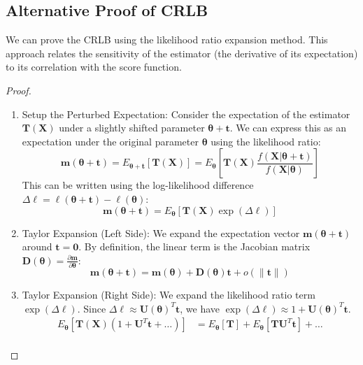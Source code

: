 \documentclass[
  letterpaper,
  DIV=11,
  numbers=noendperiod]{scrreprt}
\renewcommand{\[}{\begin{equation}}
\renewcommand{\]}{\end{equation}}
\theoremstyle{definition}
\theoremstyle{plain}
\theoremstyle{plain}
\theoremstyle{plain}
\theoremstyle{definition}
\theoremstyle{plain}
\theoremstyle{remark}
\begin{document}
\subsection{Alternative Proof of CRLB}\label{alternative-proof-of-crlb}

We can prove the CRLB using the likelihood ratio expansion method. This
approach relates the sensitivity of the estimator (the derivative of its
expectation) to its correlation with the score function.

\begin{proof}
\leavevmode

\begin{enumerate}
\def\labelenumi{\arabic{enumi}.}
\item
  Setup the Perturbed Expectation: Consider the expectation of the
  estimator \(\mathbf{T}(\mathbf{X})\) under a slightly shifted
  parameter \(\boldsymbol{\theta} + \mathbf{t}\). We can express this as
  an expectation under the original parameter \(\boldsymbol{\theta}\)
  using the likelihood ratio: \[
  \mathbf{m}(\boldsymbol{\theta} + \mathbf{t}) = E_{\boldsymbol{\theta} + \mathbf{t}}[\mathbf{T}(\mathbf{X})] = E_{\boldsymbol{\theta}} \left[ \mathbf{T}(\mathbf{X}) \frac{f(\mathbf{X}|\boldsymbol{\theta} + \mathbf{t})}{f(\mathbf{X}|\boldsymbol{\theta})} \right]
  \] This can be written using the log-likelihood difference
  \(\Delta \ell = \ell(\boldsymbol{\theta} + \mathbf{t}) - \ell(\boldsymbol{\theta})\):
  \[
  \mathbf{m}(\boldsymbol{\theta} + \mathbf{t}) = E_{\boldsymbol{\theta}} \left[ \mathbf{T}(\mathbf{X}) \exp(\Delta \ell) \right]
  \]
\item
  Taylor Expansion (Left Side): We expand the expectation vector
  \(\mathbf{m}(\boldsymbol{\theta} + \mathbf{t})\) around
  \(\mathbf{t}=\mathbf{0}\). By definition, the linear term is the
  Jacobian matrix
  \(\mathbf{D}(\boldsymbol{\theta}) = \frac{\partial \mathbf{m}}{\partial \boldsymbol{\theta}}\):
  \[
  \mathbf{m}(\boldsymbol{\theta} + \mathbf{t}) = \mathbf{m}(\boldsymbol{\theta}) + \mathbf{D}(\boldsymbol{\theta}) \mathbf{t} + o(\|\mathbf{t}\|)
  \]
\item
  Taylor Expansion (Right Side): We expand the likelihood ratio term
  \(\exp(\Delta \ell)\). Since
  \(\Delta \ell \approx \mathbf{U}(\boldsymbol{\theta})^T \mathbf{t}\),
  we have
  \(\exp(\Delta \ell) \approx 1 + \mathbf{U}(\boldsymbol{\theta})^T \mathbf{t}\).
  \[
  \begin{aligned}
  E_{\boldsymbol{\theta}} \left[ \mathbf{T}(\mathbf{X}) (1 + \mathbf{U}^T \mathbf{t} + \dots) \right] &= E_{\boldsymbol{\theta}}[\mathbf{T}] + E_{\boldsymbol{\theta}}[\mathbf{T} \mathbf{U}^T \mathbf{t}] + \dots \\

\end{aligned}\]
\end{enumerate}
\end{proof}
\end{document}
